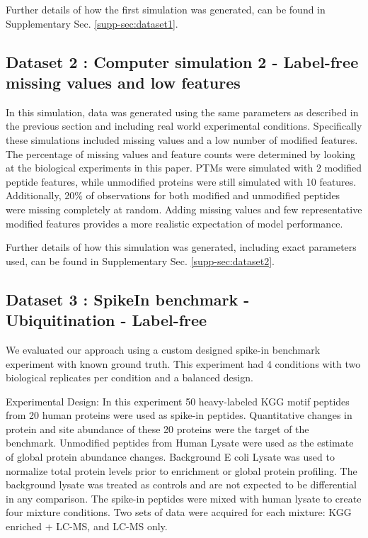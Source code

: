 \documentclass[mcp]{article}
\numberwithin{table}{section}
\begin{document}
Further details of how the first simulation was generated, can be found in Supplementary Sec. \ref{supp-sec:dataset1}.

\subsection*{Dataset 2 : Computer simulation 2 - Label-free missing values and low features}
\label{sec:comp_sim_procedure2}

In this simulation, data was generated using the same parameters as described in the previous section and including real world experimental conditions. Specifically these simulations included missing values and a low number of modified features. The percentage of missing values and feature counts were determined by looking at the biological experiments in this paper. PTMs were simulated with 2 modified peptide features, while unmodified proteins were still simulated with 10 features. Additionally, 20\% of observations for both modified and unmodified peptides were missing completely at random. Adding missing values and few representative modified features provides a more realistic expectation of model performance.

Further details of how this simulation was generated, including exact parameters used, can be found in Supplementary Sec. \ref{supp-sec:dataset2}.
 
\subsection*{Dataset 3 : SpikeIn benchmark - Ubiquitination - Label-free}
\label{sec:exp_proc_dataset3}
We evaluated our approach using a custom designed spike-in benchmark experiment with known ground truth. This experiment had 4 conditions with two biological replicates per condition and a balanced design.

Experimental Design: In this experiment 50 heavy-labeled KGG motif peptides from 20 human proteins were used as spike-in peptides. Quantitative changes in protein and site abundance of these 20 proteins were the target of the benchmark.  Unmodified peptides from Human Lysate were used as the estimate of global protein abundance changes. Background E coli Lysate was used to normalize total protein levels prior to enrichment or global protein profiling. The background lysate was treated as controls and are not expected to be differential in any comparison. The spike-in peptides were mixed with human lysate to create four mixture conditions. Two sets of data were acquired for each mixture: KGG enriched + LC-MS, and LC-MS only.
\end{document}
